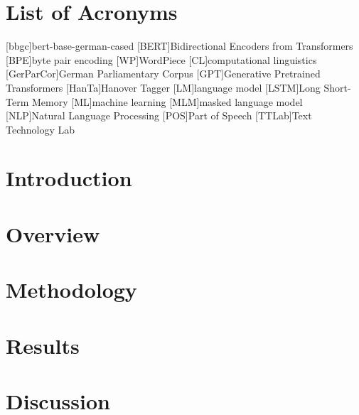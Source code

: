 \documentclass[12pt, a4paper, english]{ttlab-qualify}
\begin{document}
    \chapter*{List of Acronyms}
    \begin{acronym}
        [bbgc]{bert-base-german-cased}
        [BERT]{Bidirectional Encoders from Transformers}
        [BPE]{byte pair encoding}
        [WP]{WordPiece}
        [CL]{computational linguistics}
        [GerParCor]{German Parliamentary Corpus}
        [GPT]{Generative Pretrained Transformers}
        [HanTa]{Hanover Tagger}
        [LM]{language model}
        [LSTM]{Long Short-Term Memory}
        [ML]{machine learning}
        [MLM]{masked language model}
        [NLP]{Natural Language Processing}
        [POS]{Part of Speech}
        [TTLab]{Text Technology Lab}


    \end{acronym}

    \cleardoubleoddpage


    \chapter{Introduction}
    \setcounter{page}{1}
    \label{ch:introduction}
    

    \chapter{Overview}
    \label{ch:overview}
    


    \chapter{Methodology}
    \label{ch:methodology}
    


    \chapter{Results}
    \label{ch:results}
    


    \chapter{Discussion}
    \label{ch:discussion}
    
\end{document}
